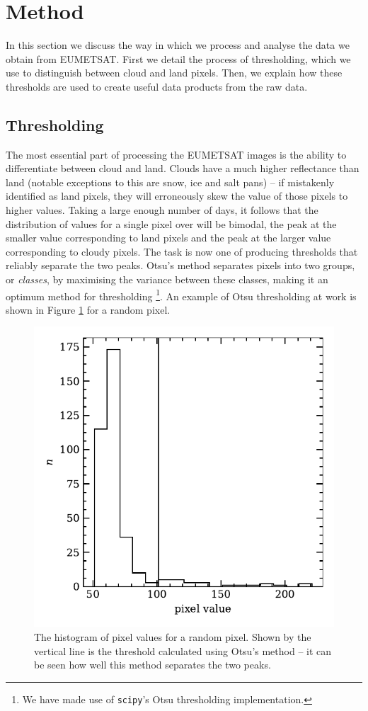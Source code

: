 \section{Method}

In this section we discuss the way in which we process and analyse the data we obtain from EUMETSAT. First we detail the process of thresholding, which we use to distinguish between cloud and land pixels. Then, we explain how these thresholds are used to create useful data products from the raw data.

\subsection{Thresholding}
The most essential part of processing the EUMETSAT images is the ability to
differentiate between cloud and land. Clouds have a much higher reflectance than
land (notable exceptions to this are snow, ice and salt pans) -- if mistakenly
identified as land pixels, they will erroneously skew the value of those pixels
to higher values. Taking a large enough number of days, it follows that the
distribution of values for a single pixel over will be bimodal, the peak at the
smaller value corresponding to land pixels and the peak at the larger value
corresponding to cloudy pixels. The task is now one of producing thresholds that
reliably separate the two peaks. Otsu's method \citep{gonzalez2008} separates
pixels into two groups, or \emph{classes}, by maximising the variance between
these classes, making it an optimum method for thresholding \footnote{We have
  made use of \texttt{scipy}'s Otsu thresholding implementation.}. An example of
Otsu thresholding at work is shown in Figure \ref{fig:otsu} for a random pixel.
\begin{figure}
  \centering
    \includegraphics[width=0.8\linewidth]{figures/otsu_bimodal.pdf}
    \caption{The histogram of pixel values for a random pixel. Shown by the
      vertical line is the threshold calculated using Otsu's method -- it can be
      seen how well this method separates the two peaks.}
    \label{fig:otsu}
\end{figure}
